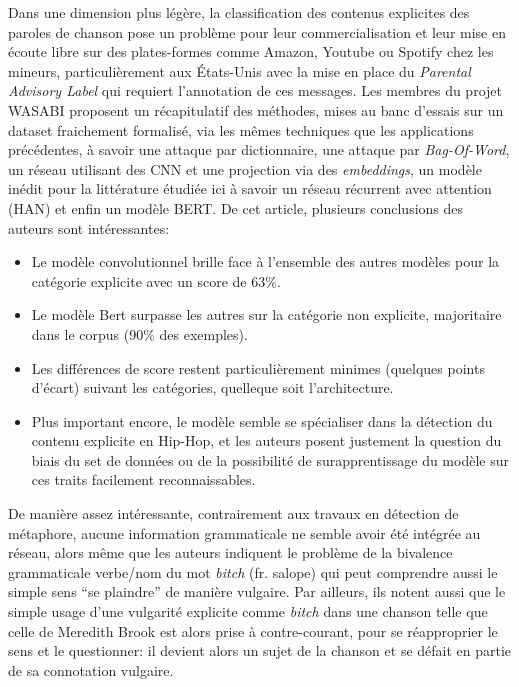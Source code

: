 Dans une dimension plus légère, la classification des contenus explicites des paroles de chanson pose un problème pour leur commercialisation et leur mise en écoute libre sur des plates-formes comme Amazon, Youtube ou Spotify chez les mineurs, particulièrement aux États-Unis avec la mise en place du \textit{Parental Advisory Label} qui requiert l'annotation de ces messages. Les membres du projet WASABI proposent un récapitulatif des méthodes, mises au banc d'essais sur un dataset fraichement formalisé, via les mêmes techniques que les applications précédentes, à savoir une attaque par dictionnaire, une attaque par \textit{Bag-Of-Word}, un réseau utilisant des CNN et une projection via des \textit{embeddings}, un modèle inédit pour la littérature étudiée ici à savoir un réseau récurrent avec attention (HAN) et enfin un modèle BERT. De cet article, plusieurs conclusions des auteurs sont intéressantes:
\begin{itemize}
    \item Le modèle convolutionnel brille face à l'ensemble des autres modèles pour la catégorie explicite avec un score de 63\%.
    \item Le modèle Bert surpasse les autres sur la catégorie non explicite, majoritaire dans le corpus (90\% des exemples).
    \item Les différences de score restent particulièrement minimes (quelques points d'écart) suivant les catégories, quelleque soit l'architecture.
    \item Plus important encore, le modèle semble se spécialiser dans la détection du contenu explicite en Hip-Hop, et les auteurs posent justement la question du biais du set de données ou de la possibilité de surapprentissage du modèle sur ces traits facilement reconnaissables.
\end{itemize}
De manière assez intéressante, contrairement aux travaux en détection de métaphore, aucune information grammaticale ne semble avoir été intégrée au réseau, alors même que les auteurs indiquent le problème de la bivalence grammaticale verbe/nom du mot \textit{bitch} (fr. salope) qui peut comprendre aussi le simple sens \enquote{se plaindre} de manière vulgaire. Par ailleurs, ils notent aussi que le simple usage d'une vulgarité explicite comme \textit{bitch} dans une chanson telle que celle de Meredith Brook est alors prise à contre-courant, pour se réapproprier le sens et le questionner: il devient alors un sujet de la chanson et se défait en partie de sa connotation vulgaire.

